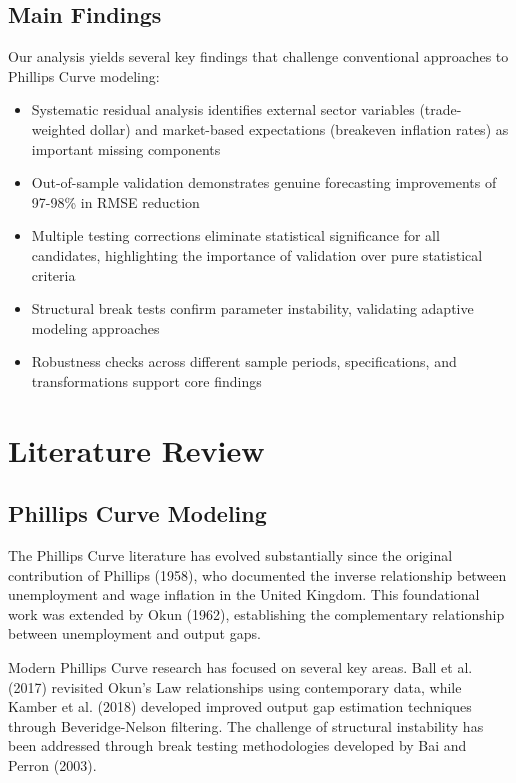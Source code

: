\documentclass[12pt]{article}
\begin{document}
\subsection{Main Findings}

Our analysis yields several key findings that challenge conventional approaches to Phillips Curve modeling:

\begin{itemize}
\item Systematic residual analysis identifies external sector variables (trade-weighted dollar) and market-based expectations (breakeven inflation rates) as important missing components
\item Out-of-sample validation demonstrates genuine forecasting improvements of 97-98\% in RMSE reduction
\item Multiple testing corrections eliminate statistical significance for all candidates, highlighting the importance of validation over pure statistical criteria  
\item Structural break tests confirm parameter instability, validating adaptive modeling approaches
\item Robustness checks across different sample periods, specifications, and transformations support core findings
\end{itemize}

\section{Literature Review}

\subsection{Phillips Curve Modeling}

The Phillips Curve literature has evolved substantially since the original contribution of Phillips (1958), who documented the inverse relationship between unemployment and wage inflation in the United Kingdom. This foundational work was extended by Okun (1962), establishing the complementary relationship between unemployment and output gaps.

Modern Phillips Curve research has focused on several key areas. Ball et al. (2017) revisited Okun's Law relationships using contemporary data, while Kamber et al. (2018) developed improved output gap estimation techniques through Beveridge-Nelson filtering. The challenge of structural instability has been addressed through break testing methodologies developed by Bai and Perron (2003).
\end{document}
